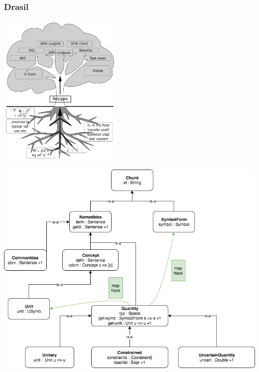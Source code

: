 \documentclass[t,12pt,numbers,fleqn]{beamer}
\begin{document}

\begin{frame}

\frametitle{Drasil}
\vspace{-1cm}
\begin{center}
\includegraphics[height=20em]{../Figures/tree.png}
\end{center}
\end{frame}


\begin{frame}
\includegraphics[width=1\textwidth]{../Figures/class_hierarchy.png}
\end{frame}


\end{document}

